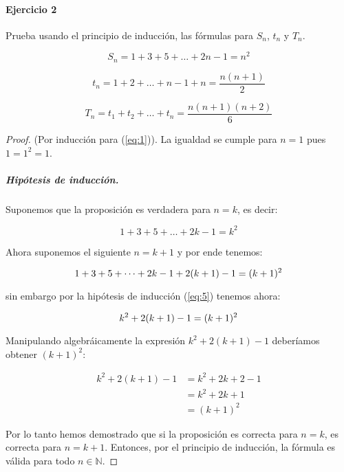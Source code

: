 \documentclass{article}
\begin{document}
\paragraph{Ejercicio 2} Prueba usando el principio de inducción, las fórmulas para $S_n$, $t_n$ y $T_n$.

\begin{equation} \label{eq:1}
	S_n = 1 + 3 +5 + \dots + 2n - 1 = n^2 
\end{equation}

\begin{equation}
	t_n = 1 + 2 + \dots + n - 1  + n = \frac{n(n+1)}{2}
\end{equation}

\begin{equation}
	T_n = t_1 + t_2 + \dots + t_n = \frac{n(n+1)(n+2)}{6}
\end{equation}

\begin{proof}(Por inducción para (\ref{eq:1})). La igualdad se cumple para $n=1$ pues $1 = 1^2 = 1$.
	
\subparagraph{Hipótesis de inducción.} Suponemos que la proposición es verdadera para $n=k$, es decir:

	\begin{equation}\label{eq:5}
		1 + 3 + 5 + \dots + 2k-1 = k^2
	\end{equation}

Ahora suponemos el siguiente $n = k + 1$ y por ende tenemos:

\[
	1 + 3 + 5 + \dots + 2k - 1 + 2(k+1) - 1 = (k + 1)^2\\
\]	

sin embargo por la hipótesis de inducción (\ref{eq:5}) tenemos ahora:

\[
	k^2 + 2(k+1) - 1 = (k + 1)^2\\
\]

Manipulando algebráicamente la expresión $k^2 + 2(k+1) - 1$ deberíamos obtener $(k + 1)^2$:

\begin{align*}
	k^2 + 2(k+1) - 1 &= k^2 + 2k + 2 - 1 \\
	&= k^2 + 2k + 1\\
	&= (k + 1)^2
\end{align*}

Por lo tanto hemos demostrado que si la proposición es correcta para $n = k$, es correcta para $n=k+1$. Entonces, por el principio de inducción, la fórmula es válida para todo $n \in \mathbb{N}$.

\end{proof}

	
\end{document}
